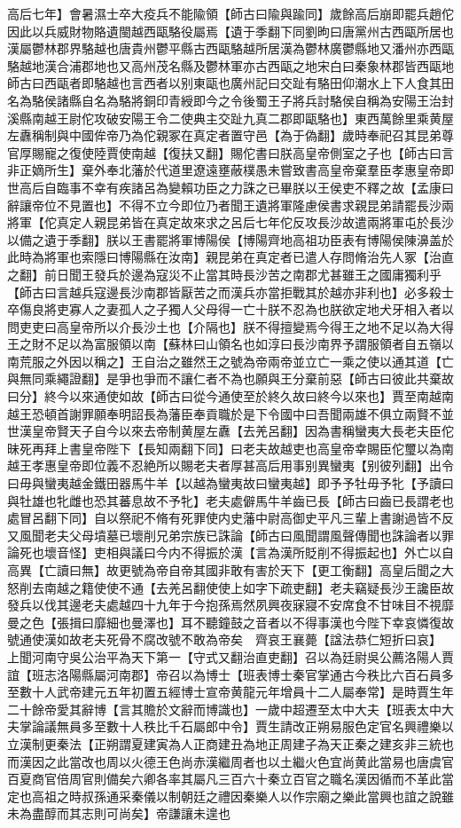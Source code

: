 高后七年】會暑濕士卒大疫兵不能隃領【師古曰隃與踰同】歲餘高后崩即罷兵趙佗因此以兵威財物賂遺閩越西甌駱役屬焉【遺于季翻下同劉昫曰唐黨州古西甌所居也漢屬鬱林郡界駱越也唐貴州鬱平縣古西甌駱越所居漢為鬱林廣鬱縣地又潘州亦西甌駱越地漢合浦郡地也又高州茂名縣及鬱林軍亦古西甌之地宋白曰秦象林郡皆西甌地師古曰西甌者即駱越也言西者以别東甌也廣州記曰交趾有駱田仰潮水上下人食其田名為駱侯諸縣自名為駱將銅印青綬即今之令後蜀王子將兵討駱侯自稱為安陽王治封溪縣南越王尉佗攻破安陽王令二使典主交趾九真二郡即甌駱也】東西萬餘里乘黄屋左纛稱制與中國侔帝乃為佗親冢在真定者置守邑【為于偽翻】歲時奉祀召其昆弟尊官厚賜寵之復使陸賈使南越【復扶又翻】賜佗書曰朕高皇帝側室之子也【師古曰言非正嫡所生】棄外奉北藩於代道里遼遠壅蔽樸愚未嘗致書高皇帝棄羣臣孝惠皇帝即世高后自臨事不幸有疾諸呂為變賴功臣之力誅之已畢朕以王侯吏不釋之故【孟康曰辭讓帝位不見置也】不得不立今即位乃者聞王遺將軍隆慮侯書求親昆弟請罷長沙兩將軍【佗真定人親昆弟皆在真定故來求之呂后七年佗反攻長沙故遣兩將軍屯於長沙以備之遺于季翻】朕以王書罷將軍博陽侯【博陽齊地高祖功臣表有博陽侯陳濞盖於此時為將軍也索隱曰博陽縣在汝南】親昆弟在真定者已遣人存問脩治先人冢【治直之翻】前日聞王發兵於邊為寇災不止當其時長沙苦之南郡尤甚雖王之國庸獨利乎【師古曰言越兵寇邊長沙南郡皆厭苦之而漢兵亦當拒戰其於越亦非利也】必多殺士卒傷良將吏寡人之妻孤人之子獨人父母得一亡十朕不忍為也朕欲定地犬牙相入者以問吏吏曰高皇帝所以介長沙土也【介隔也】朕不得擅變焉今得王之地不足以為大得王之財不足以為富服領以南【蘇林曰山領名也如淳曰長沙南界予謂服領者自五嶺以南荒服之外因以稱之】王自治之雖然王之號為帝兩帝並立亡一乘之使以通其道【亡與無同乘繩證翻】是爭也爭而不讓仁者不為也願與王分棄前惡【師古曰彼此共棄故曰分】終今以來通使如故【師古曰從今通使至於終久故曰終今以來也】賈至南越南越王恐頓首謝罪願奉明詔長為藩臣奉貢職於是下令國中曰吾聞兩雄不俱立兩賢不並世漢皇帝賢天子自今以來去帝制黄屋左纛【去羌呂翻】因為書稱蠻夷大長老夫臣佗昧死再拜上書皇帝陛下【長知兩翻下同】曰老夫故越吏也高皇帝幸賜臣佗璽以為南越王孝惠皇帝即位義不忍絶所以賜老夫者厚甚高后用事别異蠻夷【别彼列翻】出令曰毋與蠻夷越金鐵田器馬牛羊【以越為蠻夷故曰蠻夷越】即予予牡毋予牝【予讀曰與牡雄也牝雌也恐其蕃息故不予牝】老夫處僻馬牛羊齒已長【師古曰齒已長謂老也處冒呂翻下同】自以祭祀不脩有死罪使内史藩中尉高御史平凡三輩上書謝過皆不反又風聞老夫父母墳墓已壞削兄弟宗族已誅論【師古曰風聞謂風聲傳聞也誅論者以罪論死也壞音怪】吏相與議曰今内不得振於漢【言為漢所貶削不得振起也】外亡以自高異【亡讀曰無】故更號為帝自帝其國非敢有害於天下【更工衡翻】高皇后聞之大怒削去南越之籍使使不通【去羌呂翻使使上如字下疏吏翻】老夫竊疑長沙王讒臣故發兵以伐其邊老夫處越四十九年于今抱孫焉然夙興夜寐寢不安席食不甘味目不視靡曼之色【張揖曰靡細也曼澤也】耳不聽鐘鼓之音者以不得事漢也今陛下幸哀憐復故號通使漢如故老夫死骨不腐改號不敢為帝矣　齊哀王襄薨【諡法恭仁短折曰哀】　上聞河南守吳公治平為天下第一【守式又翻治直吏翻】召以為廷尉吳公薦洛陽人賈誼【班志洛陽縣屬河南郡】帝召以為博士【班表博士秦官掌通古今秩比六百石員多至數十人武帝建元五年初置五經博士宣帝黄龍元年增員十二人屬奉常】是時賈生年二十餘帝愛其辭博【言其贍於文辭而博識也】一歲中超遷至太中大夫【班表太中大夫掌論議無員多至數十人秩比千石屬郎中令】賈生請改正朔易服色定官名興禮樂以立漢制更秦法【正朔謂夏建寅為人正商建丑為地正周建子為天正秦之建亥非三統也而漢因之此當改也周以火德王色尚赤漢繼周者也以土繼火色宜尚黄此當易也唐虞官百夏商官倍周官則備矣六卿各率其屬凡三百六十秦立百官之職名漢因循而不革此當定也高祖之時叔孫通采秦儀以制朝廷之禮因秦樂人以作宗廟之樂此當興也誼之說雖未為盡醇而其志則可尚矣】帝謙讓未遑也

